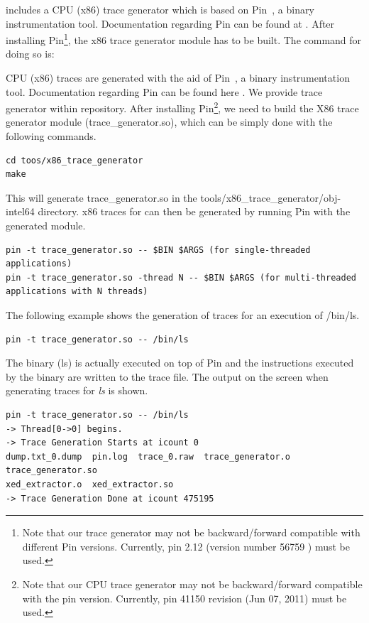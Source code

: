 \SIM includes a CPU (x86) trace generator which is based on Pin~\cite{pin}, a
binary instrumentation tool. Documentation regarding Pin can be found at
. After installing Pin\footnote{Note that our
trace generator may not be backward/forward compatible with different Pin
versions. Currently, pin 2.12 (version number 56759  )  must be used.}, the x86
trace generator module has to be built. The command for doing so is:


\ignore
		{
		CPU (x86) traces are generated with the aid of Pin~\cite{pin}, a
		binary instrumentation tool.  Documentation regarding Pin can be found 
		here .  We provide
		\cpu trace generator within \SIM repository. After installing
		Pin\footnote{Note that our CPU trace generator may not be
		  backward/forward compatible with the pin version. Currently, pin
		  41150 revision (Jun 07, 2011) must be used.}, we need to build the
		X86 trace generator module (trace\_generator.so), which can be simply
		done with the following commands.
		}



\begin{Verbatim}
cd toos/x86_trace_generator
make
\end{Verbatim}

\noindent This will generate trace\_generator.so in the
tools/x86\_trace\_generator/obj-intel64 directory. x86
traces for \SIM can then be generated by running Pin with the generated module.


\begin{Verbatim}
pin -t trace_generator.so -- $BIN $ARGS (for single-threaded applications)
pin -t trace_generator.so -thread N -- $BIN $ARGS (for multi-threaded applications with N threads)
\end{Verbatim}


The following example shows the generation of traces for an execution of /bin/ls. 

\begin{Verbatim}
pin -t trace_generator.so -- /bin/ls
\end{Verbatim}


\noindent The binary (ls) is actually executed on top of Pin and the
instructions executed by the binary are written to the trace file. The output
on the screen when generating traces for \textit{ls} is shown.

\begin{Verbatim}
pin -t trace_generator.so -- /bin/ls
-> Thread[0->0] begins.
-> Trace Generation Starts at icount 0
dump.txt_0.dump  pin.log  trace_0.raw  trace_generator.o  trace_generator.so  
xed_extractor.o  xed_extractor.so
-> Trace Generation Done at icount 475195
\end{Verbatim}

